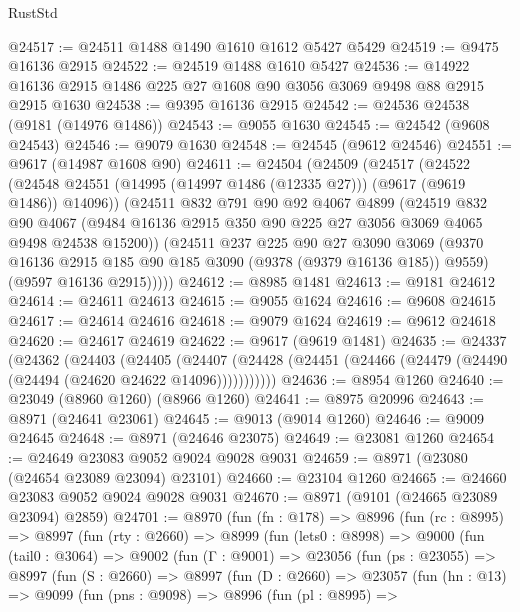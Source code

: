 \begin{lexlean}{RustStd}
\begin{coremodule}
@24517 := @24511 @1488 @1490 @1610 @1612 @5427 @5429
@24519 := @9475 @16136 @2915
@24522 := @24519 @1488 @1610 @5427
@24536 := @14922 @16136 @2915 @1486 @225 @27 @1608 @90 @3056 @3069 @9498 @88 @2915 @2915 @1630
@24538 := @9395 @16136 @2915
@24542 := @24536 @24538 (@9181 (@14976 @1486))
@24543 := @9055 @1630
@24545 := @24542 (@9608 @24543)
@24546 := @9079 @1630
@24548 := @24545 (@9612 @24546)
@24551 := @9617 (@14987 @1608 @90)
@24611 := @24504
    (@24509
      (@24517
        (@24522 (@24548 @24551 (@14995 (@14997 @1486 (@12335 @27))) (@9617 (@9619 @1486)) @14096))
        (@24511
          @832
          @791
          @90
          @92
          @4067
          @4899
          (@24519
            @832
            @90
            @4067
            (@9484 @16136 @2915 @350 @90 @225 @27 @3056 @3069 @4065 @9498 @24538 @15200))
          (@24511
            @237
            @225
            @90
            @27
            @3090
            @3069
            (@9370 @16136 @2915 @185 @90 @185 @3090 (@9378 (@9379 @16136 @185)) @9559)
            (@9597 @16136 @2915)))))
@24612 := @8985 @1481
@24613 := @9181 @24612
@24614 := @24611 @24613
@24615 := @9055 @1624
@24616 := @9608 @24615
@24617 := @24614 @24616
@24618 := @9079 @1624
@24619 := @9612 @24618
@24620 := @24617 @24619
@24622 := @9617 (@9619 @1481)
@24635 := @24337
    (@24362
      (@24403
        (@24405
          (@24407 (@24428 (@24451 (@24466 (@24479 (@24490 (@24494 (@24620 @24622 @14096)))))))))))
@24636 := @8954 @1260
@24640 := @23049 (@8960 @1260) (@8966 @1260)
@24641 := @8975 @20996
@24643 := @8971 (@24641 @23061)
@24645 := @9013 (@9014 @1260)
@24646 := @9009 @24645
@24648 := @8971 (@24646 @23075)
@24649 := @23081 @1260
@24654 := @24649 @23083 @9052 @9024 @9028 @9031
@24659 := @8971 (@23080 (@24654 @23089 @23094) @23101)
@24660 := @23104 @1260
@24665 := @24660 @23083 @9052 @9024 @9028 @9031
@24670 := @8971 (@9101 (@24665 @23089 @23094) @2859)
@24701 := @8970
    (fun (fn : @178) =>
    @8996
      (fun (rc : @8995) =>
      @8997
        (fun (rty : @2660) =>
        @8999
          (fun (lets0 : @8998) =>
          @9000
            (fun (tail0 : @3064) =>
            @9002
              (fun (Γ : @9001) =>
              @23056
                (fun (ps : @23055) =>
                @8997
                  (fun (S : @2660) =>
                  @8997
                    (fun (D : @2660) =>
                    @23057
                      (fun (hn : @13) =>
                      @9099
                        (fun (pns : @9098) =>
                        @8996
                          (fun (pl : @8995) =>

\end{coremodule}
\end{lexlean}
